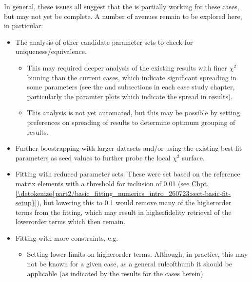 \documentclass[letterpaper,table,10pt,english]{jupyterBook}
\begin{document}
\sphinxAtStartPar
In general, these issues all suggest that the {\hyperref[\detokenize{backmatter/glossary:term-bootstrap-retrieval-protocol}]{}} is partially working for these cases, but may not yet be complete. A number of avenues remain to be explored here, in particular:
\begin{itemize}
\item {} 
\sphinxAtStartPar
The analysis of other candidate parameter sets to check for uniqueness/equivalence.
\begin{itemize}
\item {} 
\sphinxAtStartPar
This may required deeper analysis of the existing results with finer \(\chi^2\) binning than the current cases, which indicate significant spreading in some parameters (see the  and  subsections in each case study chapter, particularly the paramter plots which indicate the spread in results).

\item {} 
\sphinxAtStartPar
This analysis is not yet automated, but this may be possible by setting preferences on spreading of results to determine optimum grouping of results.

\end{itemize}

\item {} 
\sphinxAtStartPar
Further boostrapping with larger datasets and/or using the existing best fit parameters as seed values to further probe the local \(\chi^2\) surface.

\item {} 
\sphinxAtStartPar
Fitting with reduced parameter sets. These were set based on the reference matrix elements with a threshold for inclusion of 0.01 (see \hyperref[\detokenize{part2/basic_fitting_numerics_intro_260723:sect-basic-fit-setup}]{Chpt.\@ \ref{\detokenize{part2/basic_fitting_numerics_intro_260723:sect-basic-fit-setup}}}), but lowering this to 0.1 would remove many of the higher\sphinxhyphen{}order terms from the fitting, which may result in higher\sphinxhyphen{}fidelity retrieval of the lower\sphinxhyphen{}order terms which then remain.

\item {} 
\sphinxAtStartPar
Fitting with more constraints, e.g.
\begin{itemize}
\item {} 
\sphinxAtStartPar
Setting lower limits on higher\sphinxhyphen{}order terms. Although, in practice, this may not be known  for a given case, as a general rule\sphinxhyphen{}of\sphinxhyphen{}thumb it should be applicable (as indicated by the  results for the cases herein).


\end{itemize}
\end{itemize}
\end{document}
